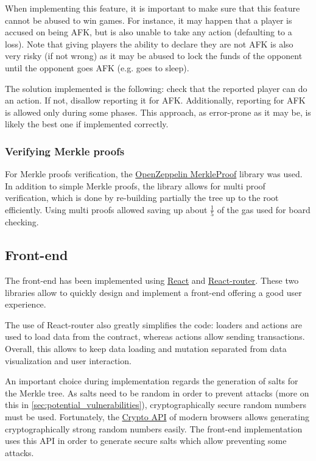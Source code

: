When implementing this feature, it is important to make sure that this feature
cannot be abused to win games. For instance, it may happen that a player is
accused on being AFK, but is also unable to take any action (defaulting to a
loss). Note that giving players the ability to declare they are not AFK is also
very risky (if not wrong) as it may be abused to lock the funds of the opponent
until the opponent goes AFK (e.g. goes to sleep).

The solution implemented is the following: check that the reported player can
do an action. If not, disallow reporting it for AFK. Additionally, reporting
for AFK is allowed only during some phases. This approach, as error-prone as it
may be, is likely the best one if implemented correctly.

\subsubsection{Verifying Merkle proofs}
For Merkle proofs verification, the
\href{https://docs.openzeppelin.com/contracts/4.x/api/utils\#MerkleProof}{\color{blue}OpenZeppelin
	MerkleProof} library was used. In addition to simple Merkle proofs, the library
allows for multi proof verification, which is done by re-building partially the
tree up to the root efficiently. Using multi proofs allowed saving up about
$\frac{1}{5}$ of the gas used for board checking.

\subsection{Front-end}
\label{sec:implementation-front-end}
The front-end has been implemented using \href{https://react.dev/}{\color{blue}
	React} and \href{https://reactrouter.com/en/main}{\color{blue} React-router}.
These two libraries allow to quickly design and implement a front-end offering
a good user experience.

The use of React-router also greatly simplifies the code: loaders and actions
are used to load data from the contract, whereas actions allow sending
transactions. Overall, this allows to keep data loading and mutation separated
from data visualization and user interaction.

An important choice during implementation regards the generation of salts for
the Merkle tree. As salts need to be random in order to prevent attacks (more
on this in \cref{sec:potential_vulnerabilities}), cryptographically secure
random numbers must be used. Fortunately, the
\href{https://developer.mozilla.org/en-US/docs/Web/API/Crypto}{\color{blue}Crypto
	API} of modern browsers allows generating cryptographically strong random
numbers easily. The front-end implementation uses this API in order to generate
secure salts which allow preventing some attacks.

